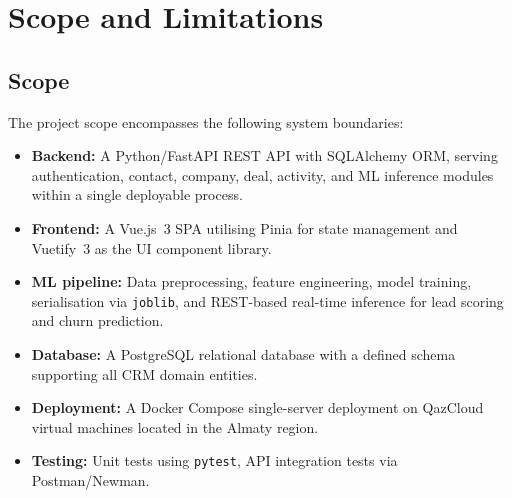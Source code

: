 \section{Scope and Limitations}

\subsection{Scope}

The project scope encompasses the following system boundaries:

\begin{itemize}
  \item \textbf{Backend:} A Python/FastAPI REST API with SQLAlchemy ORM,
  serving authentication, contact, company, deal, activity, and ML
  inference modules within a single deployable process.

  \item \textbf{Frontend:} A Vue.js~3 SPA utilising Pinia for state
  management and Vuetify~3 as the UI component library.

  \item \textbf{ML pipeline:} Data preprocessing, feature engineering,
  model training, serialisation via \texttt{joblib}, and REST-based
  real-time inference for lead scoring and churn prediction.

  \item \textbf{Database:} A PostgreSQL relational database with a
  defined schema supporting all CRM domain entities.

  \item \textbf{Deployment:} A Docker Compose single-server deployment on
  QazCloud virtual machines located in the Almaty region.

  \item \textbf{Testing:} Unit tests using \texttt{pytest}, API integration
  tests via Postman/Newman.
\end{itemize}


